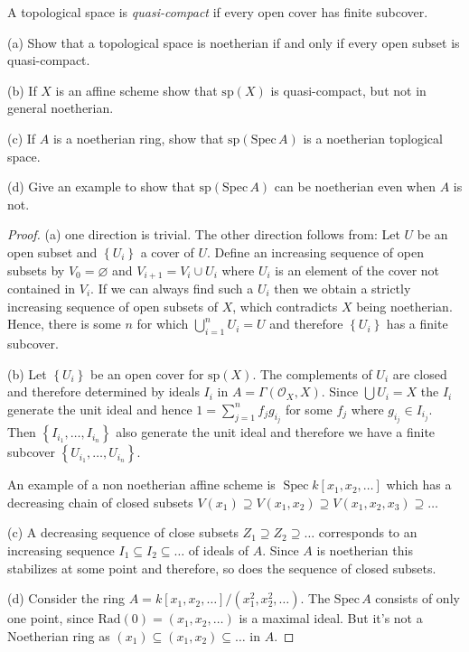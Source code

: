 \begin{exe}
	\label{2.2.13}
	A topological space is \emph{quasi-compact} if every open cover has finite subcover.
	
	(a) Show that a topological space is noetherian if and only if every open subset is quasi-compact.
	
	(b) If $X$ is an affine scheme show that $\mathrm{sp} (X)$ is quasi-compact, but not in general noetherian.
	
	(c) If $A$ is a noetherian ring, show that $\mathrm{sp} (\mathrm{Spec}\,A)$ is a noetherian toplogical space.
	
	(d) Give an example to show that $\mathrm{sp}(\mathrm{Spec}\,A)$ can be noetherian even when $A$ is not.
\end{exe}
\begin{proof}
	(a) one direction is trivial.  The other direction follows from: Let $U$ be an open subset and $\left\{U_{i}\right\}$ a cover of $U$.  Define an increasing sequence of open subsets by $V_{0}=\varnothing$ and $V_{i+1}=V_{i} \cup U_{i}$ where $U_{i}$ is an element of the cover not contained in $V_{i} .$ If we can always find such a $U_{i}$ then we obtain a strictly increasing sequence of open subsets of $X$, which contradicts $X$ being noetherian. Hence, there is some $n$ for which $\bigcup_{i=1}^{n} U_{i}=U$ and therefore $\left\{U_{i}\right\}$ has a finite subcover.
	
	(b) Let $\left\{U_{i}\right\}$ be an open cover for $\mathrm{sp}(X)$. The complements of $U_{i}$ are closed and therefore determined by ideals $I_{i}$ in $A=\Gamma\left(\mathcal{O}_{X}, X\right) .$ Since $\bigcup U_{i}=X$ the $I_{i}$ generate the unit ideal and hence $1=\sum_{j=1}^{n} f_{j} g_{i_{j}}$ for some $f_{j}$ where $g_{i_{j}} \in I_{i_{j}} .$ Then $\left\{I_{i_{1}}, \ldots, I_{i_{n}}\right\}$ also generate the unit ideal and therefore we have a finite subcover $\left\{U_{i_{1}}, \ldots, U_{i_{n}}\right\}$.
	
	An example of a non noetherian affine scheme is $\operatorname{Spec} k\left[x_{1}, x_{2}, \ldots\right]$ which has a decreasing chain of closed subsets $V\left(x_{1}\right) \supseteq V\left(x_{1}, x_{2}\right) \supseteq V\left(x_{1}, x_{2}, x_{3}\right) \supseteq\dots$
	
	(c) A decreasing sequence of close subsets $Z_{1} \supseteq Z_{2} \supseteq \ldots$ corresponds to an increasing sequence $I_{1} \subseteq I_{2} \subseteq \ldots$ of ideals of $A .$ Since $A$ is noetherian this stabilizes at some point and therefore, so does the sequence of closed subsets.
	
	
	(d) Consider the ring $A=k\left[x_{1}, x_{2}, \ldots\right] /\left(x_{1}^{2}, x_{2}^{2}, \ldots\right)$. The $\mathrm{Spec}\,A$ consists of only one point, since $\mathrm{Rad}(0)=(x_1,x_2,\dots)$ is a maximal ideal. But it's not a Noetherian ring as $(x_1)\subseteq(x_1,x_2)\subseteq\dots$ in $A$.
\end{proof}
